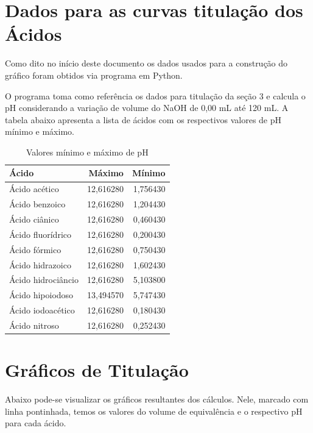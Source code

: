 \documentclass[a4paper, 12pt]{article}
\begin{document}
\section{Dados para as curvas titulação dos Ácidos}
Como dito no início deste documento os dados usados para a construção do gráfico foram obtidos via programa em Python. 

O programa toma como referência os dados para titulação da seção 3 e calcula o pH considerando a variação de volume do NaOH de 0,00 mL até 120 mL. A tabela abaixo apresenta a lista de ácidos com os respectivos valores de pH mínimo e máximo.

\begin{table}[H]
	\begin{center}
		\caption{Valores mínimo e máximo de pH}
		\label{tbl_vlr_minimo_maximo_pH}
		\begin{tabular}{l|rr} \toprule
			Ácido & Máximo & Mínimo \\ \midrule
			Ácido acético & 12,616280 & 1,756430 \\
			Ácido benzoico & 12,616280 & 1,204430 \\
			Ácido ciânico & 12,616280 & 0,460430 \\
			Ácido fluorídrico & 12,616280 & 0,200430 \\
			Ácido fórmico & 12,616280 & 0,750430 \\
			Ácido hidrazoico & 12,616280 & 1,602430 \\
			Ácido hidrociâncio & 12,616280 & 5,103800 \\
			Ácido hipoiodoso & 13,494570 & 5,747430 \\
			Ácido iodoacético & 12,616280 & 0,180430 \\
			Ácido nitroso & 12,616280 & 0,252430 \\
			\bottomrule
		\end{tabular}
	\end{center}
\end{table}

\section{Gráficos de Titulação}
Abaixo pode-se visualizar os gráficos resultantes dos cálculos. Nele, marcado com linha pontinhada, temos os valores do volume de equivalência e o respectivo pH para cada ácido.
\end{document}
